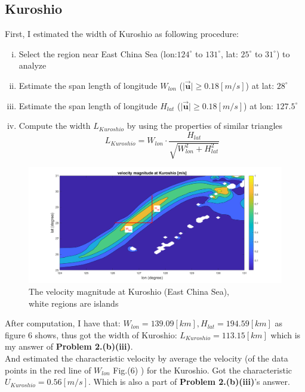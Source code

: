 \documentclass[12pt]{article}
\begin{document}
\begin{CJK*}{UTF8}{bsmi}
\subsection{Kuroshio}
First, I estimated the width of Kuroshio as following procedure:
\begin{enumerate}[(i)]
	\item Select the region near East China Sea (lon:$124^\circ$ to $131^\circ$, lat: $25^\circ$ to $31^\circ$) to analyze
	\item Estimate the span length of longitude $W_{lon}$ ($\vert{\vec{\textbf{u}}}\vert\ge 0.18[m/s]$) at lat: $28^\circ$
	\item Estimate the span length of longitude $H_{lat}$ ($\vert{\vec{\textbf{u}}}\vert\ge 0.18[m/s]$) at lon: $127.5^\circ$
	\item Compute the width $L_{Kuroshio}$ by using the properties of similar triangles
		\begin{equation}
			L_{Kuroshio} = W_{lon} \cdot \frac{H_{lat}}{\sqrt{W_{lon}^2+H_{lat}^2}}
		\end{equation}
\end{enumerate}

\begin{figure}[h]
 	\centering
	\includegraphics[width=1\textwidth]{Fig2b4.pdf}
	\caption{The velocity magnitude at Kuroshio (East China Sea),\\ white regions are islands}
\end{figure}
After computation, I have that: $W_{lon} = 139.09 [km], H_{lat} = 194.59 [km]$ as figure 6 shows, thus got the width of Kuroshio: $L_{Kuroshio} = 113.15 [km]$ which is my answer of \textbf{Problem 2.(b)(iii)}.\\

And estimated the characteristic velocity by average the velocity (of the data points in the red line of $W_{lon}$ Fig.(6) ) for the Kuroshio. Got the characteristic $U_{Kuroshio} = 0.56 [m/s]$. Which is also a part of \textbf{Problem 2.(b)(iii)}'s answer.\\


\end{CJK*}
\end{document}
